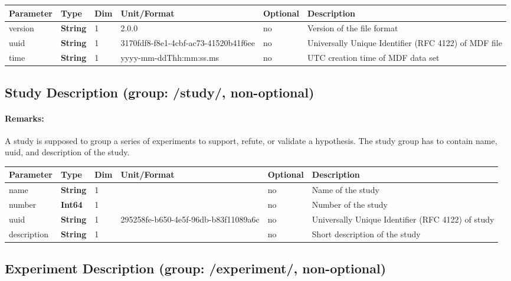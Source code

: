 \documentclass[landscape,a4paper]{article} %
\newcommand{\inltab}[1]{{\ttfamily\bfseries\color{blue}#1}}
\newcommand{\inlvar}[1]{{\ttfamily#1}}
\begin{document}
\noindent \begin{tabularx}{\columnwidth}{lllllX} 
\textbf{Parameter} & \textbf{Type} & \textbf{Dim} & \textbf{Unit/Format} & \textbf{Optional} & \textbf{Description} \\ \hline 
\inlvar{version} & \inltab{String} & 1 & 2.0.0 & no & Version of the file format \\ \hline
\inlvar{uuid} & \inltab{String} & 1 & 3170fdf8-f8e1-4cbf-ac73-41520b41f6ee & no & Universally Unique Identifier (RFC 4122) of MDF file \\ \hline 
\inlvar{time} & \inltab{String} & 1 & yyyy-mm-ddThh:mm:ss.ms & no & UTC creation time of MDF data set \\ \hline
\end{tabularx}


\subsection{Study Description (group: \inlvar{/study/}, non-optional)}

\begin{multicols}{2}
	\paragraph{Remarks:} A study is supposed to group a series of experiments to support, refute, or validate a hypothesis. The study group has to contain \inlvar{name}, \inlvar{uuid}, and \inlvar{description} of the study.
\end{multicols}

\noindent \begin{tabularx}{\columnwidth}{lllllX} 
\textbf{Parameter} & \textbf{Type} & \textbf{Dim} & \textbf{Unit/Format} & \textbf{Optional} & \textbf{Description} \\ \hline 
\inlvar{name} & \inltab{String} & 1 & & no & Name of the study \\ \hline
\inlvar{number} & \inltab{Int64} & 1 & & no & Number of the study\\ \hline
\inlvar{uuid} & \inltab{String} & 1 & 295258fe-b650-4e5f-96db-b83f11089a6c & no & Universally Unique Identifier (RFC 4122) of study \\ \hline 
\inlvar{description} & \inltab{String} & 1 & & no & Short description of the study \\ \hline
\end{tabularx}


\subsection{Experiment Description (group: \inlvar{/experiment/}, non-optional)}
\end{document}
